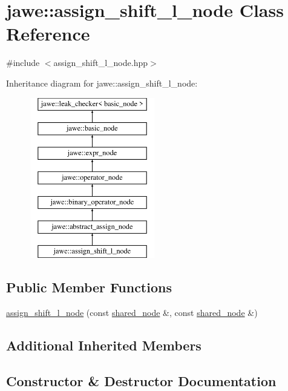 \hypertarget{classjawe_1_1assign__shift__l__node}{}\section{jawe\+:\+:assign\+\_\+shift\+\_\+l\+\_\+node Class Reference}
\label{classjawe_1_1assign__shift__l__node}


{\ttfamily \#include $<$assign\+\_\+shift\+\_\+l\+\_\+node.\+hpp$>$}

Inheritance diagram for jawe\+:\+:assign\+\_\+shift\+\_\+l\+\_\+node\+:\begin{figure}[H]
\begin{center}
\leavevmode
\includegraphics[height=7.000000cm]{classjawe_1_1assign__shift__l__node}
\end{center}
\end{figure}
\subsection*{Public Member Functions}
\begin{DoxyCompactItemize}
\item 
\hyperlink{classjawe_1_1assign__shift__l__node_a2080d7988468a35784e84850b5dcc60a}{assign\+\_\+shift\+\_\+l\+\_\+node} (const \hyperlink{namespacejawe_a3f307481d921b6cbb50cc8511fc2b544}{shared\+\_\+node} \&, const \hyperlink{namespacejawe_a3f307481d921b6cbb50cc8511fc2b544}{shared\+\_\+node} \&)
\end{DoxyCompactItemize}
\subsection*{Additional Inherited Members}


\subsection{Constructor \& Destructor Documentation}
\mbox{\label{classjawe_1_1assign__shift__l__node_a2080d7988468a35784e84850b5dcc60a}} 

